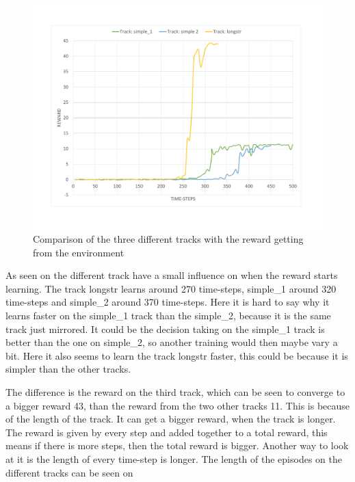\begin{figure}[H]
	\centering
	\includegraphics[width=1\textwidth]{Figures/Result/change_of_track_reward_graph.pdf}
	\caption{Comparison of the three different tracks with the reward getting from the environment}
	\label{fig:change_of_track_reward_graph}
\end{figure}

As seen on  the different track have a small influence on when the reward starts learning. The track longstr learns around 270 time-steps, simple\_1 around 320 time-steps and simple\_2 around 370 time-steps. Here it is hard to say why it learns faster on the simple\_1 track than the simple\_2, because it is the same track just mirrored. It could be the decision taking on the simple\_1 track is better than the one on simple\_2, so another training would then maybe vary a bit. Here it also seems to learn the track longstr faster, this could be because it is simpler than the other tracks.  

The difference is the reward on the third track, which can be seen to converge to a bigger reward 43, than the reward from the two other tracks 11. This is because of the length of the track. It can get a bigger reward, when the track is longer. The reward is given by every step and added together to a total reward, this means if there is more steps, then the total reward is bigger. Another way to look at it is the length of every time-step is longer. The length of the episodes on the different tracks can be seen on      

